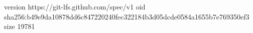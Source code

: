 version https://git-lfs.github.com/spec/v1
oid sha256:b49e9da10878dd6c847220240fec322184b3d05dcde0584a1655b7e769350ef3
size 19781
